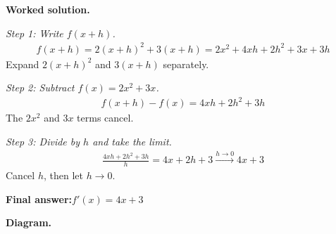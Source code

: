 \documentclass[11pt]{article}
\begin{document}
\textbf{Worked solution.}

\textit{Step 1: Write \( f(x+h) \).}
\[\begin{gathered}
f(x+h) = 2(x+h)^2 + 3(x+h) = 2x^2 + 4xh + 2h^2 + 3x + 3h
\end{gathered}\]
Expand \( 2(x+h)^2 \) and \( 3(x+h) \) separately.

\textit{Step 2: Subtract \( f(x) = 2x^2 + 3x \).}
\[\begin{gathered}
f(x+h) - f(x) = 4xh + 2h^2 + 3h
\end{gathered}\]
The \( 2x^2 \) and \( 3x \) terms cancel.

\textit{Step 3: Divide by \( h \) and take the limit.}
\[\begin{gathered}
\frac{4xh + 2h^2 + 3h}{h} = 4x + 2h + 3 \xrightarrow{h \to 0} 4x + 3
\end{gathered}\]
Cancel \( h \), then let \( h \to 0 \).

\begin{answerbox}
\textbf{Final answer:}\quad \(\displaystyle  f'(x) = 4x + 3 \)
\end{answerbox}
\textbf{Diagram.}
\end{document}
